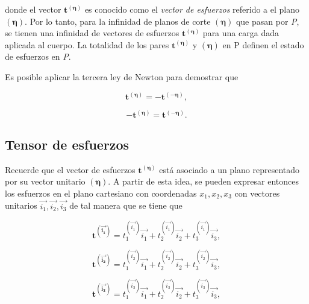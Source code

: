 \documentclass{article}
\begin{document}
    donde el vector $\bm{t^{\bm{(\eta)}}}$ es conocido como el \textit{vector de esfuerzos}
    referido a el plano $\bm{(\eta)}$.
    Por lo tanto, para la infinidad de planos de corte $\bm{(\eta)}$ que pasan por \textit{P},
    se tienen una infinidad de vectores de esfuerzos $\bm{t^{\bm{(\eta)}}}$ para una carga
    dada aplicada al cuerpo. La totalidad de los pares $\bm{t^{\bm{(\eta)}}}$ y $\bm{(\eta)}$
    en P definen el estado de esfuerzos en \textit{P}.

    Es posible aplicar la tercera ley de Newton para demostrar que

    \begin{equation}
        \bm{t^{\bm{(\eta)}}} = - \bm{t^{\bm{(-\eta)}}},
    \end{equation}

    \begin{equation}
        -\bm{t^{\bm{(\eta)}}} = \bm{t^{\bm{(-\eta)}}}.
    \end{equation}

    \subsection{Tensor de esfuerzos}

    Recuerde que el vector de esfuerzos $\bm{t^{\bm{(\eta)}}}$ est\'{a} asociado a un plano 
    representado por su vector unitario $\bm{(\eta)}$. A partir de esta idea, se pueden
    expresar entonces los esfuerzos en el plano cartesiano con coordenadas $x_{1}, x_{2}, x_{3}$ 
    con vectores unitarios $\vec{i_{1}}, \vec{i_{2}}, \vec{i_{3}}$ de tal manera que se tiene que

    \begin{equation}
        \bm{t^{(\vec{i_{1}})}} = t_{1}^{(\vec{i_{1}})}\vec{i_{1}} + 
        t_{2}^{(\vec{i_{1}})}\vec{i_{2}} + 
        t_{3}^{(\vec{i_{1}})}\vec{i_{3}},
    \end{equation}

    \begin{equation}
        \bm{t^{(\vec{i_{2}})}} = t_{1}^{(\vec{i_{2}})}\vec{i_{1}} + 
        t_{2}^{(\vec{i_{2}})}\vec{i_{2}} + 
        t_{3}^{(\vec{i_{2}})}\vec{i_{3}},
    \end{equation}

    \begin{equation}
        \bm{t^{(\vec{i_{3}})}} = t_{1}^{(\vec{i_{3}})}\vec{i_{1}} + 
        t_{2}^{(\vec{i_{3}})}\vec{i_{2}} + 
        t_{3}^{(\vec{i_{3}})}\vec{i_{3}},
    \end{equation}
\end{document}
